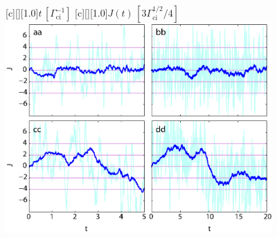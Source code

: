 

    \figstyle
    [c][][1.0]{$t\,[\Gamma_\text{ci}^{-1}]$}
    [c][][1.0]{$J(t)\,[3\Gamma_\text{ci}^{1/2}/4]$}
    \includegraphics[width=4in]{ghz3.eps}


